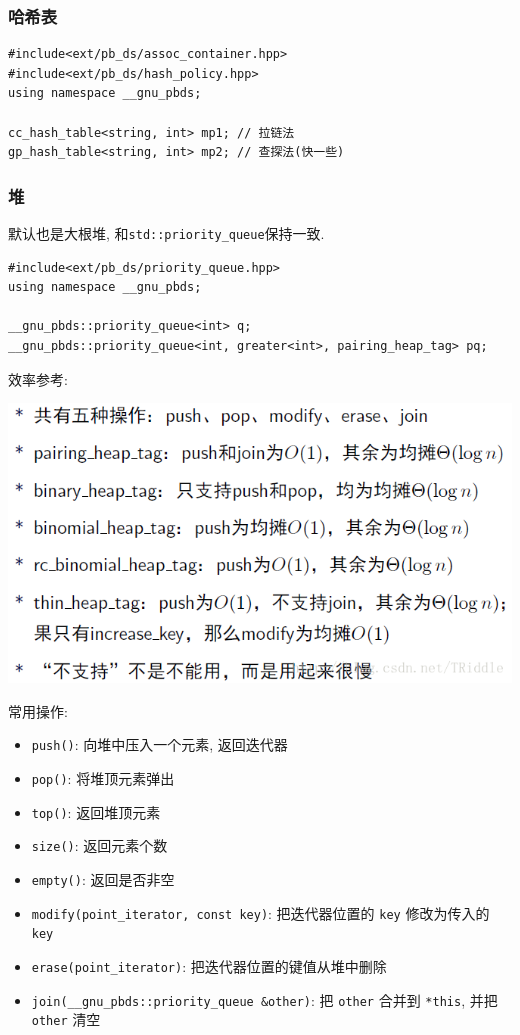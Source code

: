 \subsubsection{哈希表}

\begin{verbatim}
#include<ext/pb_ds/assoc_container.hpp>
#include<ext/pb_ds/hash_policy.hpp>
using namespace __gnu_pbds;

cc_hash_table<string, int> mp1; // 拉链法
gp_hash_table<string, int> mp2; // 查探法(快一些)
\end{verbatim}

\subsubsection{堆}

默认也是大根堆, 和\texttt{std::priority_queue}保持一致.

\begin{verbatim}
#include<ext/pb_ds/priority_queue.hpp>
using namespace __gnu_pbds;

__gnu_pbds::priority_queue<int> q;
__gnu_pbds::priority_queue<int, greater<int>, pairing_heap_tag> pq;
\end{verbatim}

效率参考:

\includegraphics[scale = 0.385]{../src/misc/pbds_heap.png}

常用操作:

\begin{itemize}

	\item \texttt{push()}: 向堆中压入一个元素, 返回迭代器
	\item \texttt{pop()}: 将堆顶元素弹出
	\item \texttt{top()}: 返回堆顶元素
	\item \texttt{size()}: 返回元素个数
	\item \texttt{empty()}: 返回是否非空
	\item \texttt{modify(point_iterator, const key)}: 把迭代器位置的 \texttt{key} 修改为传入的 \texttt{key}
	\item \texttt{erase(point_iterator)}: 把迭代器位置的键值从堆中删除
	\item \texttt{join(__gnu_pbds::priority_queue &other)}: 把 \texttt{other} 合并到 \texttt{*this}, 并把 \texttt{other} 清空
\end{itemize}

